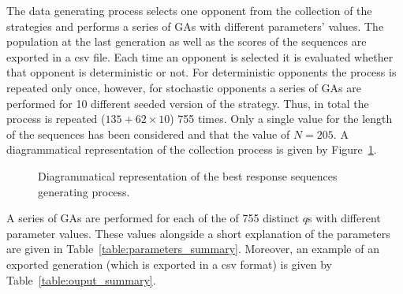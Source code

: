The data generating process selects one opponent from the collection of the
\numberofstrategiesbestsequences strategies and performs a series of GAs with
different parameters' values. The population at the last generation as well as
the scores of the sequences are exported in a csv file. Each time an opponent is
selected it is evaluated whether that opponent is deterministic or not. For
deterministic opponents the process is repeated only once, however, for
stochastic opponents a series of GAs are performed for 10 different seeded
version of the strategy. Thus, in total the process is repeated (\(135 + 62
\times 10\)) 755 times. Only a single value for the length of the
sequences has been considered and that the value of \(N=205\). A diagrammatical
representation of the collection process is given by
Figure~\ref{fig:data_generating_process_diagram}.

\begin{figure}[!htbp]
    \centering
    
    \caption{Diagrammatical representation of the best response
    sequences generating process.}\label{fig:data_generating_process_diagram}
\end{figure}

A series of GAs are performed for each of the of 755 distinct \(q\)s with
different parameter values. These values alongside a short explanation of the
parameters are given in Table~\ref{table:parameters_summary}. Moreover,
an example of an exported generation (which is exported in a csv format)
is given by Table~\ref{table:ouput_summary}.

\begin{table}[!htbp]
    \begin{center}
    \end{center}
    \caption{The parameters of the genetic algorithm.}\label{table:parameters_summary}
\end{table}

